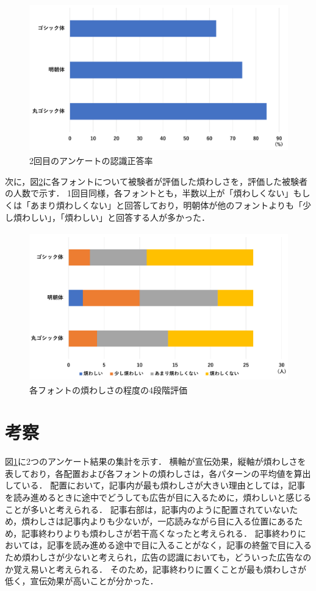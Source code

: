 \documentclass[12pt,a4j,titlepage]{ltjsarticle}
\begin{document}
\begin{figure}[H]
\begin{center}
 \includegraphics[height=65mm]{figures/広告認識正答率_2.pdf}
\end{center}
 \caption{2回目のアンケートの認識正答率}
 \label{fig:広告認識正答率_2}
\end{figure}

次に，図\ref{fig:煩わしさ_2}に各フォントについて被験者が評価した煩わしさを，評価した被験者の人数で示す．
1回目同様，各フォントとも，半数以上が「煩わしくない」もしくは「あまり煩わしくない」と回答しており，明朝体が他のフォントよりも「少し煩わしい」，「煩わしい」と回答する人が多かった．

\begin{figure}[H]
\begin{center}
 \includegraphics[height=65mm]{figures/煩わしさ_2.pdf}
\end{center}
 \caption{各フォントの煩わしさの程度の4段階評価}
 \label{fig:煩わしさ_2}
\end{figure}

\clearpage

\section{考察}
図\ref{}に2つのアンケート結果の集計を示す．
横軸が宣伝効果，縦軸が煩わしさを表しており，各配置および各フォントの煩わしさは，各パターンの平均値を算出している．
配置において，記事内が最も煩わしさが大きい理由としては，記事を読み進めるときに途中でどうしても広告が目に入るために，煩わしいと感じることが多いと考えられる．
記事右部は，記事内のように配置されていないため，煩わしさは記事内よりも少ないが，一応読みながら目に入る位置にあるため，記事終わりよりも煩わしさが若干高くなったと考えられる．
記事終わりにおいては，記事を読み進める途中で目に入ることがなく，記事の終盤で目に入るため煩わしさが少ないと考えられ，広告の認識においても，どういった広告なのか覚え易いと考えられる．
そのため，記事終わりに置くことが最も煩わしさが低く，宣伝効果が高いことが分かった．
\end{document}

